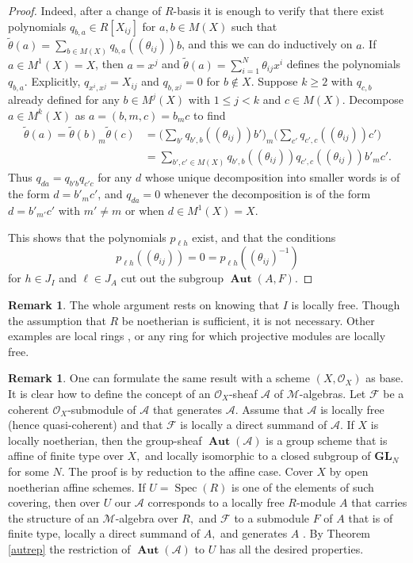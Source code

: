 \documentclass{article}
\theoremstyle{definition}
\newtheorem{rem}[thm]{Remark}
\def\Spec{\ensuremath{\operatorname{Spec}}}
\def\BAut{\ensuremath{\operatorname{\mathbf{Aut}}}}
\def\BGL{\ensuremath{\mathbf{G}\mathbf{L}}}
\def\Mu{\ensuremath{\mathcal{M}}}
\begin{document}
\begin{proof}
Indeed, after a change of $R$-basis it is enough to verify that there exist polynomials $q_{b,a} \in R[X_{ij}]$ for $a, b \in M(X)$ such that $\widetilde \theta(a) = \sum_{b \in M(X)} q_{b,a}((\theta_{ij})) b$, and this we can do inductively on $a$.
If $a \in M^1(X) = X$, then $a = x^j$ and $\widetilde \theta(a) = \sum_{i = 1}^N \theta_{ij} x^i$ defines the polynomials $q_{b,a}.$ Explicitly,  $q_{x^i, x^j} = X_{ij}$ and $q_{b,x^j} = 0$ for $b \notin X.$
Suppose $k \geq 2$ with $q_{c,b}$ already defined for any $b \in M^j(X)$ with $1 \leq j < k$ and $c \in M(X)$. Decompose $a \in M^k(X)$ as $a = (b,m,c) = b_m c$ to find
\begin{align*} \widetilde \theta(a) = \widetilde \theta(b) _m \widetilde \theta (c) &= \Bigg( \sum_{b'} q_{b',b}((\theta_{ij})) b' \Bigg)_m \Bigg( \sum_{c'} q_{c',c}((\theta_{ij})) c' \Bigg) \\ &= \sum_{b', c' \in M(X)} q_{b',b}((\theta_{ij})) q_{c',c}((\theta_{ij})) b'_m c' .\end{align*}
Thus $q_{da} = q_{b'b} q_{c'c}$ for any $d$ whose unique decomposition into smaller words is of the form $d = b' _m c'$, and $q_{da} = 0$ whenever the decomposition is of the form $d = b'_{m'} c'$ with $m' \neq m$ or when $d \in M^1(X) = X$.

	This shows that the polynomials $p_{\ell h}$ exist, and that the conditions \[ p_{\ell h} ((\theta_{ij})) = 0 = p_{\ell h} ((\theta_{ij})^{-1}) \] for $h \in J_I$ and $\ell \in J_A$ cut out the subgroup  $\BAut(A,F)$.	 \end{proof}
	
	\begin{rem} The whole argument rests on knowing that $I$ is locally free. Though the assumption that $R$ be noetherian is sufficient, it is not necessary. Other examples are local rings \cite{K}, or any ring for which projective modules are locally free.
	\end{rem}
	
	\begin{rem} One can formulate the same result with a scheme $(X, \mathcal{O}_X)$ as base. It is clear how to define the concept of an $\mathcal{O}_X$-sheaf $\mathcal{A}$ of $\Mu$-algebras.  Let $\mathcal{F}$ be a coherent $\mathcal{O}_X$-submodule of $\mathcal{A}$ that generates $\mathcal{A}$. Assume that $\mathcal{A}$ is locally free (hence quasi-coherent) and that $\mathcal{F}$ is locally a direct summand of $\mathcal{A}.$ If $X$ is locally noetherian, then the group-sheaf $\BAut(\mathcal{A})$ is a group scheme that is affine of finite type over $X,$ and locally isomorphic to a closed subgroup of $\BGL_{N}$ for some $N.$ The proof is by reduction to the affine case. Cover $X$ by open noetherian affine schemes. If  $U = \Spec(R)$ is one of the elements of such covering, then over $U$ our $\mathcal{A}$ corresponds to a locally free $R$-module $A$ that carries the structure of an $\Mu$-algebra over $R,$ and $\mathcal{F}$ to a  submodule $F$ of $A$ that is of finite type, locally a direct summand of $A,$ and generates $A$ . By Theorem \ref{autrep} the restriction of $\BAut (\mathcal{A})$ to $U$ has all the desired properties.
 \end{rem}
\end{document}
